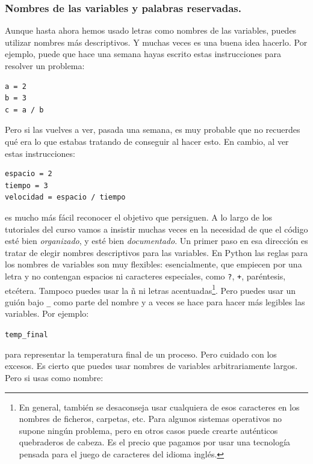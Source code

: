 \documentclass[10pt,a4paper]{article}\usepackage[]{graphicx}\usepackage[]{color}
\makeatletter
\newcommand{\hlstd}[1]{\textcolor[rgb]{0.345,0.345,0.345}{#1}}%
\newenvironment{kframe}{%
 \def\at@end@of@kframe{}%
 \ifinner\ifhmode%
  \def\at@end@of@kframe{\end{minipage}}%
  \begin{minipage}{\columnwidth}%
 \fi\fi%
 \def\FrameCommand##1{\hskip\@totalleftmargin \hskip-\fboxsep
 \colorbox{shadecolor}{##1}\hskip-\fboxsep
     \hskip-\linewidth \hskip-\@totalleftmargin \hskip\columnwidth}%
 \MakeFramed {\advance\hsize-\width
   \@totalleftmargin\z@ \linewidth\hsize
   \@setminipage}}%
 {\par\unskip\endMakeFramed%
 \at@end@of@kframe}
\newenvironment{knitrout}{}{} %
\newcounter {cont01}
\makeatother
\begin{document}
\subsubsection*{Nombres de las variables y palabras reservadas.}
\label{tut02:subsubsec:nombresVariablesPalabrasReservadas}
Aunque hasta ahora hemos usado letras como nombres de las variables, puedes utilizar nombres más descriptivos. Y muchas veces es una buena idea hacerlo. Por ejemplo,  puede que hace una semana hayas escrito estas instrucciones para resolver un problema:
\begin{verbatim}
a = 2
b = 3
c = a / b
\end{verbatim}
Pero si las vuelves a ver, pasada una semana, es muy probable que no recuerdes qué era lo que estabas tratando de conseguir al hacer esto. En cambio, al ver estas instrucciones:
\begin{verbatim}
espacio = 2
tiempo = 3
velocidad = espacio / tiempo
\end{verbatim}
es mucho más fácil reconocer el objetivo que persiguen. A lo largo de los tutoriales del curso vamos a insistir muchas veces en la necesidad de que el código esté bien {\em organizado}, y esté bien {\em documentado}. Un primer paso en esa dirección es tratar de elegir nombres descriptivos para las variables. En Python las reglas para los nombres de variables son muy flexibles: esencialmente, que empiecen por una letra y no contengan espacios ni caracteres especiales, como {\tt ?}, {\tt +}, paréntesis, etcétera. Tampoco puedes usar la ñ ni letras acentuadas\footnote{En general, también se desaconseja usar cualquiera de esos caracteres en los nombres de ficheros, carpetas, etc. Para algunos sistemas operativos no supone ningún problema, pero en otros casos puede crearte auténticos quebraderos de cabeza. Es el precio que pagamos por usar una tecnología pensada para el juego de caracteres del idioma inglés.}. Pero puedes usar un guión bajo \verb#_# como parte del nombre y a veces se hace para hacer más legibles las variables. Por ejemplo:
\begin{knitrout}
\color{fgcolor}\begin{kframe}
\begin{alltt}
\hlstd{temp_final}
\end{alltt}
\end{kframe}
\end{knitrout}
para representar la temperatura final de un proceso. Pero cuidado con los excesos. Es cierto que puedes usar nombres de variables arbitrariamente largos.  Pero si usas como nombre:
\end{document}
